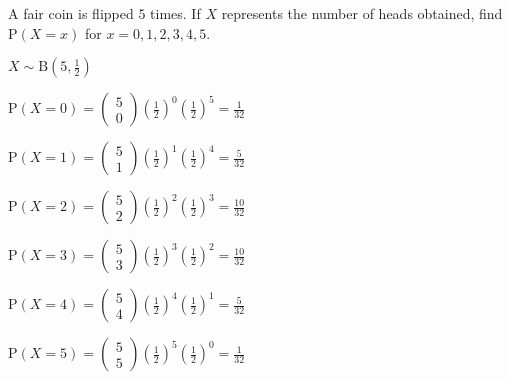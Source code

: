 \documentclass[11pt,a4paper]{book}
\begin{document}
\newpage

\begin{example}

A fair coin is flipped $5$ times. If $X$ represents the number of
heads obtained, find $\text{P}\left(X=x\right)$ for $x=0,1,2,3,4,5$.

\Solution

${\displaystyle X\sim\text{B}\left(5,\frac{1}{2}\right)}$

\begin{minipage}[t]{.5\textwidth}

${\displaystyle \text{P}\left(X=0\right)=\begin{pmatrix}5\\
0
\end{pmatrix}\left(\frac{1}{2}\right)^{0}\left(\frac{1}{2}\right)^{5}=\frac{1}{32}}$

${\displaystyle \text{P}\left(X=1\right)=\begin{pmatrix}5\\
1
\end{pmatrix}\left(\frac{1}{2}\right)^{1}\left(\frac{1}{2}\right)^{4}=\frac{5}{32}}$

${\displaystyle \text{P}\left(X=2\right)=\begin{pmatrix}5\\
2
\end{pmatrix}\left(\frac{1}{2}\right)^{2}\left(\frac{1}{2}\right)^{3}=\frac{10}{32}}$

\end{minipage}
\begin{minipage}[t]{.5\textwidth}

${\displaystyle \text{P}\left(X=3\right)=\begin{pmatrix}5\\
3
\end{pmatrix}\left(\frac{1}{2}\right)^{3}\left(\frac{1}{2}\right)^{2}=\frac{10}{32}}$

${\displaystyle \text{P}\left(X=4\right)=\begin{pmatrix}5\\
4
\end{pmatrix}\left(\frac{1}{2}\right)^{4}\left(\frac{1}{2}\right)^{1}=\frac{5}{32}}$

${\displaystyle \text{P}\left(X=5\right)=\begin{pmatrix}5\\
5
\end{pmatrix}\left(\frac{1}{2}\right)^{5}\left(\frac{1}{2}\right)^{0}=\frac{1}{32}}$

\end{minipage}

\end{example}
\end{document}
